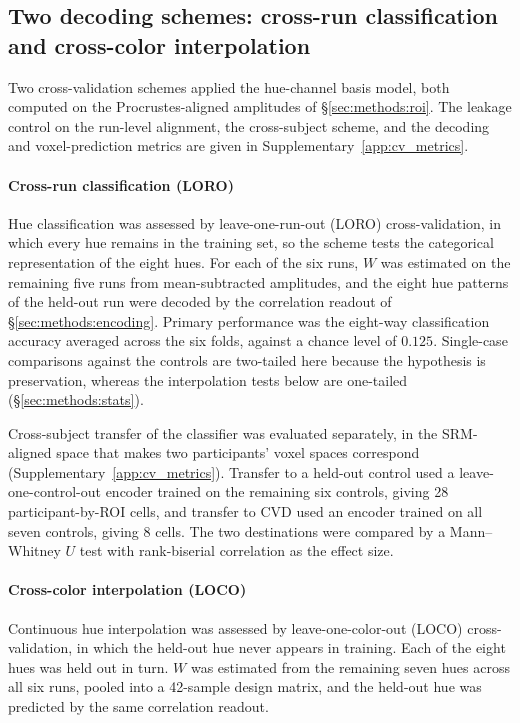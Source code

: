 \subsection{Two decoding schemes: cross-run classification and cross-color interpolation}
\label{sec:methods:loro}

Two cross-validation schemes applied the hue-channel basis model, both computed on the Procrustes-aligned amplitudes of \S\ref{sec:methods:roi}. The leakage control on the run-level alignment, the cross-subject scheme, and the decoding and voxel-prediction metrics are given in Supplementary~\cref{app:cv_metrics}.

\paragraph{Cross-run classification (LORO)}
Hue classification was assessed by leave-one-run-out (LORO) cross-validation, in which every hue remains in the training set, so the scheme tests the categorical representation of the eight hues. For each of the six runs, $W$ was estimated on the remaining five runs from mean-subtracted amplitudes, and the eight hue patterns of the held-out run were decoded by the correlation readout of \S\ref{sec:methods:encoding}. Primary performance was the eight-way classification accuracy averaged across the six folds, against a chance level of $0.125$. Single-case comparisons against the controls are two-tailed here because the hypothesis is preservation, whereas the interpolation tests below are one-tailed (\S\ref{sec:methods:stats}).

Cross-subject transfer of the classifier was evaluated separately, in the SRM-aligned space that makes two participants' voxel spaces correspond (Supplementary~\cref{app:cv_metrics}). Transfer to a held-out control used a leave-one-control-out encoder trained on the remaining six controls, giving 28 participant-by-ROI cells, and transfer to CVD used an encoder trained on all seven controls, giving 8 cells. The two destinations were compared by a Mann--Whitney $U$ test with rank-biserial correlation as the effect size. 

\paragraph{Cross-color interpolation (LOCO)}
\label{sec:methods:loco}
Continuous hue interpolation was assessed by leave-one-color-out (LOCO) cross-validation, in which the held-out hue never appears in training. Each of the eight hues was held out in turn. $W$ was estimated from the remaining seven hues across all six runs, pooled into a 42-sample design matrix, and the held-out hue was predicted by the same correlation readout.

